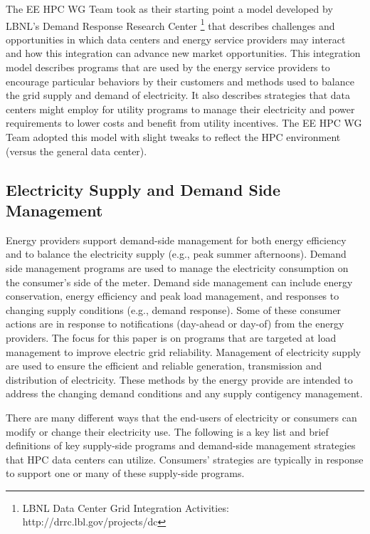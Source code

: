 The EE HPC WG Team took as their starting point a model developed by LBNL's 
Demand Response Research Center \footnote{LBNL
Data Center Grid Integration Activities: http://drrc.lbl.gov/projects/dc} that
describes challenges and opportunities in which data centers and energy service providers may
interact and how this integration can advance new market opportunities. This
integration model describes programs that are used by the energy service
providers to encourage particular behaviors by their customers and methods used
to balance the grid supply and demand of electricity. It also describes
strategies that data centers might employ for utility programs to manage their
electricity and power requirements to lower costs and benefit from utility incentives. The EE HPC WG Team adopted
this model with slight tweaks to reflect the HPC environment (versus the
general data center).


\subsection{Electricity Supply and Demand Side Management}

Energy providers support demand-side management for both energy efficiency and to balance the electricity supply (e.g., peak summer afternoons). 
Demand side management programs are used to manage the electricity consumption on the consumer’s side of the meter.  
Demand side management can include energy conservation, energy efficiency and peak load management, and responses to 
changing supply conditions (e.g., demand response). Some of these consumer actions are in response to notifications (day-ahead or day-of) from the energy providers. The focus for this paper is on programs that are targeted at load management to improve electric grid reliability. 
Management of electricity supply are used to ensure the efficient and reliable generation, transmission and distribution of 
electricity.  
These methods by the energy provide are intended to address the changing demand conditions and any supply contigency management. 

There are many different ways that the end-users of electricity or consumers can modify or change their electricity use. 
The following is a key list and 
brief definitions of key supply-side programs and demand-side management strategies that HPC data centers can utilize. 
Consumers' strategies are typically in response to support one or many of these supply-side programs.



